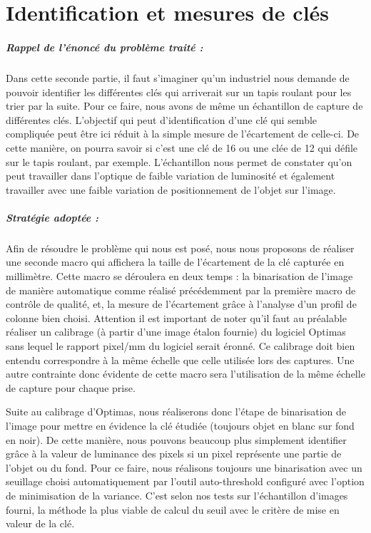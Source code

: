 \documentclass{scrreprt}
\begin{document}
\chapter{Identification et mesures de clés}

\paragraph{Rappel de l'énoncé du problème traité :}
Dans cette seconde partie, il faut s'imaginer qu'un industriel nous demande de pouvoir identifier les différentes clés qui
arriverait sur un tapis roulant pour les trier par la suite. Pour ce faire, nous avons de même un échantillon de capture
de différentes clés. L'objectif qui peut d'identification d'une clé qui semble compliquée peut être ici réduit à la simple
mesure de l'écartement de celle-ci. De cette manière, on pourra savoir si c'est une clé de 16 ou une clée de 12 qui défile 
sur le tapis roulant, par exemple. L'échantillon nous permet de constater qu'on peut travailler dans l'optique de faible
variation de luminosité et également travailler avec une faible variation de positionnement de l'objet sur l'image.
 
\paragraph{Stratégie adoptée :}
Afin de résoudre le problème qui nous est posé, nous nous proposons de réaliser une seconde macro qui affichera
la taille de l'écartement de la clé capturée en millimètre. Cette macro se déroulera en deux temps : la binarisation 
de l'image de manière automatique comme réalisé précédemment par la première macro de contrôle de qualité, et, la mesure
de l'écartement grâce à l'analyse d'un profil de colonne bien choisi. Attention il est important de noter qu'il faut au 
préalable réaliser un calibrage (à partir d'une image étalon fournie)  du logiciel Optimas sans lequel le rapport pixel/mm
du logiciel serait éronné. Ce calibrage doit bien entendu correspondre à la même échelle que celle utilisée lors des captures.
Une autre contrainte donc évidente de cette macro sera l'utilisation de la même échelle de capture pour chaque prise. 

Suite au calibrage d'Optimas, nous réaliserons donc l'étape de binarisation de l'image pour mettre en évidence la clé étudiée (toujours
objet en blanc sur fond en noir). De cette manière, nous pouvons beaucoup plus simplement identifier grâce à la valeur de luminance 
des pixels si un pixel représente une partie de l'objet ou du fond. Pour ce faire, nous réalisons toujours une binarisation avec un 
seuillage choisi automatiquement par l'outil auto-threshold configuré avec l'option de minimisation de la variance. C'est selon nos 
tests sur l'échantillon d'images fourni, la méthode la plus viable de calcul du seuil avec le critère de mise en valeur de la clé. 
\end{document}
